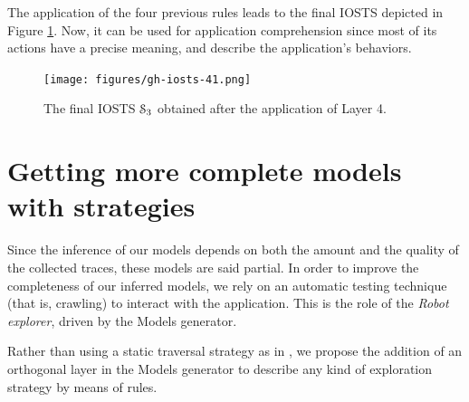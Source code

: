 \begin{example}
The application of the four previous rules leads to the final
IOSTS depicted in Figure \ref{fig:github:iosts:4}. Now, it can be
used for application comprehension since most of its actions have
a precise meaning, and describe the application's behaviors.
\end{example}

\begin{figure}[h]
    \begin{center}
    \texttt{[image: figures/gh-iosts-41.png]}
    \caption{The final IOSTS $\EuScript{S}_3$ obtained after the
    application of Layer 4.}
    \label{fig:github:iosts:4}
    \end{center}
\end{figure}


\section{Getting more complete models with strategies}
\label{sec:modelinf:webapps:strategy}

Since the inference of our models depends on both the amount and
the quality of the collected traces, these models are said
partial. In order to improve the completeness of our inferred
models, we rely on an automatic testing technique (that is,
crawling) to interact with the application. This is the role of
the \emph{Robot explorer}, driven by the Models generator.

Rather than using a static traversal strategy as in
\cite{Memon:2003,concolicandroid12,crawljax:tweb12,
Amalfitano:2012:UGR:2351676.2351717, WPX13}, we propose the
addition of an orthogonal layer in the Models generator to
describe any kind of exploration strategy by means of rules.

